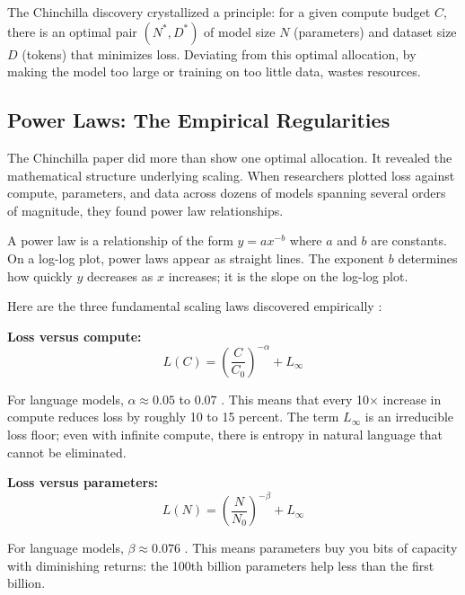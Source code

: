 The Chinchilla discovery crystallized a principle: for a given compute budget $C$, there is an optimal pair $(N^*, D^*)$ of model size $N$ (parameters) and dataset size $D$ (tokens) that minimizes loss. Deviating from this optimal allocation, by making the model too large or training on too little data, wastes resources.

\vspace{1em}

\subsection{Power Laws: The Empirical Regularities}

The Chinchilla paper did more than show one optimal allocation. It revealed the mathematical structure underlying scaling. When researchers plotted loss against compute, parameters, and data across dozens of models spanning several orders of magnitude, they found power law relationships.

A power law is a relationship of the form $y = a x^{-b}$ where $a$ and $b$ are constants. On a log-log plot, power laws appear as straight lines. The exponent $b$ determines how quickly $y$ decreases as $x$ increases; it is the slope on the log-log plot.

Here are the three fundamental scaling laws discovered empirically \citep{kaplan2020scaling,hoffmann2022chinchilla}:

\textbf{Loss versus compute:}
\begin{equation}
L(C) = \left(\frac{C}{C_0}\right)^{-\alpha} + L_{\infty}
\end{equation}

For language models, $\alpha \approx 0.05$ to $0.07$ \citep{kaplan2020scaling,hoffmann2022chinchilla}. This means that every 10$\times$ increase in compute reduces loss by roughly 10 to 15 percent. The term $L_{\infty}$ is an irreducible loss floor; even with infinite compute, there is entropy in natural language that cannot be eliminated.

\textbf{Loss versus parameters:}
\begin{equation}
L(N) = \left(\frac{N}{N_0}\right)^{-\beta} + L_{\infty}
\end{equation}

For language models, $\beta \approx 0.076$ \citep{kaplan2020scaling,hoffmann2022chinchilla}. This means parameters buy you bits of capacity with diminishing returns: the 100th billion parameters help less than the first billion.

